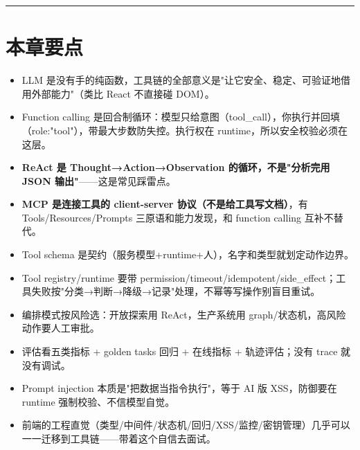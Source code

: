 \bigskip\hrule\bigskip

\section{本章要点}

\begin{itemize}[leftmargin=2em]
\item LLM 是没有手的纯函数，工具链的全部意义是"让它安全、稳定、可验证地借用外部能力"（类比 React 不直接碰 DOM）。
\item Function calling 是回合制循环：模型只给意图（tool\_call），你执行并回填（role:"tool"），带最大步数防失控。执行权在 runtime，所以安全校验必须在这层。
\item \textbf{ReAct 是 Thought→Action→Observation 的循环，不是"分析完用 JSON 输出"}——这是常见踩雷点。
\item \textbf{MCP 是连接工具的 client-server 协议（不是给工具写文档）}，有 Tools/Resources/Prompts 三原语和能力发现，和 function calling 互补不替代。
\item Tool schema 是契约（服务模型+runtime+人），名字和类型就划定动作边界。
\item Tool registry/runtime 要带 permission/timeout/idempotent/side\_effect；工具失败按"分类→判断→降级→记录"处理，不幂等写操作别盲目重试。
\item 编排模式按风险选：开放探索用 ReAct，生产系统用 graph/状态机，高风险动作要人工审批。
\item 评估看五类指标 + golden tasks 回归 + 在线指标 + 轨迹评估；没有 trace 就没有调试。
\item Prompt injection 本质是"把数据当指令执行"，等于 AI 版 XSS，防御要在 runtime 强制校验、不信模型自觉。
\item 前端的工程直觉（类型/中间件/状态机/回归/XSS/监控/密钥管理）几乎可以一一迁移到工具链——带着这个自信去面试。
\end{itemize}

